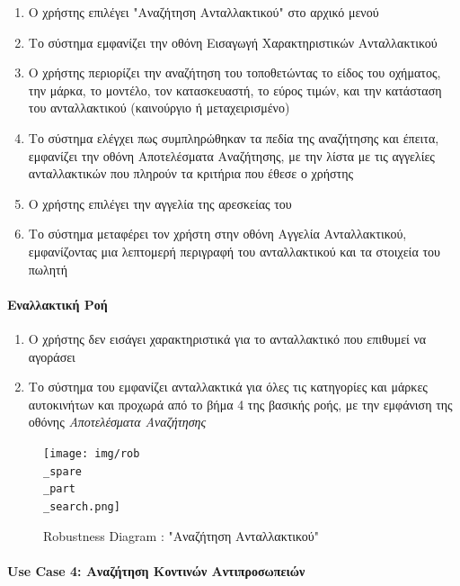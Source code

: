 \documentclass{../ol-softwaremanual}
\begin{document}
	\begin{enumerate}
		\item Ο χρήστης επιλέγει \en"\gr Αναζήτηση Ανταλλακτικού\en" \gr στο αρχικό μενού
		\item Το σύστημα εμφανίζει την οθόνη Εισαγωγή Χαρακτηριστικών Ανταλλακτικού
		\item Ο χρήστης περιορίζει την αναζήτηση του τοποθετώντας το είδος του οχήματος, την μάρκα, το μοντέλο, τον κατασκευαστή, το εύρος τιμών, και την κατάσταση του ανταλλακτικού (καινούργιο ή μεταχειρισμένο) 
		\item Το σύστημα ελέγχει πως συμπληρώθηκαν τα πεδία της αναζήτησης και έπειτα, εμφανίζει την οθόνη Αποτελέσματα Αναζήτησης, με την λίστα με τις αγγελίες ανταλλακτικών που πληρούν τα κριτήρια που έθεσε ο χρήστης
		\item Ο χρήστης επιλέγει την αγγελία της αρεσκείας του
		\item Το σύστημα μεταφέρει τον χρήστη στην οθόνη Αγγελία Ανταλλακτικού, εμφανίζοντας μια λεπτομερή περιγραφή του ανταλλακτικού και τα στοιχεία του πωλητή		
	\end{enumerate}
	
	\paragraph{Εναλλακτική Ροή}
	
	\begin{enumerate}
		\item Ο χρήστης δεν εισάγει χαρακτηριστικά για το ανταλλακτικό που επιθυμεί να αγοράσει
		\item Το σύστημα του εμφανίζει ανταλλακτικά για όλες τις κατηγορίες και μάρκες αυτοκινήτων και προχωρά από το βήμα 4 της βασικής ροής, με την εμφάνιση της οθόνης \textit{Αποτελέσματα Αναζήτησης}
	\end{enumerate}
	
	
	\begin{figure}[htbp!]
		\texttt{[image: img/rob\\\_spare\\\_part\\\_search.png]}
		\caption{\en Robustness Diagram : "\gr Αναζήτηση Ανταλλακτικού\en"\gr}
	\end{figure}
	
	\newpage
	\centering
	\paragraph{\en Use Case 4: \gr Αναζήτηση Κοντινών Αντιπροσωπειών}	
	
\end{document}
